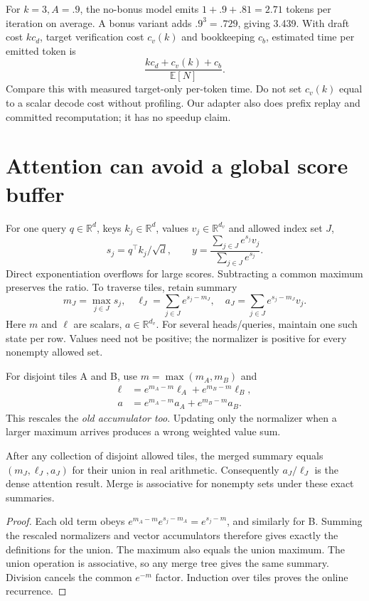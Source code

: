 For $k=3,A=.9$, the no-bonus model emits $1+.9+.81=2.71$ tokens per
iteration on average. A bonus variant adds $.9^3=.729$, giving 3.439.
With draft cost $kc_d$, target verification cost $c_v(k)$ and bookkeeping
$c_b$, estimated time per emitted token is
\[
 \frac{kc_d+c_v(k)+c_b}{\mathbb E[N]}.
\]
Compare this with measured target-only per-token time. Do not set
$c_v(k)$ equal to a scalar decode cost without profiling. Our adapter also
does prefix replay and committed recomputation; it has no speedup claim.

\section{Attention can avoid a global score buffer}
\label{evod38:attention}
For one query $q\in\mathbb R^{d}$, keys $k_j\in\mathbb R^d$, values
$v_j\in\mathbb R^{d_v}$ and allowed index set $J$,
\[
 s_j=q^\top k_j/\sqrt d,\qquad
 y=\frac{\sum_{j\in J} e^{s_j}v_j}{\sum_{j\in J}e^{s_j}}.
\]
Direct exponentiation overflows for large scores. Subtracting a common
maximum preserves the ratio. To traverse tiles, retain summary
\[
 m_J=\max_{j\in J}s_j,\quad
 \ell_J=\sum_{j\in J}e^{s_j-m_J},\quad
 a_J=\sum_{j\in J}e^{s_j-m_J}v_j.
\]
Here $m$ and $\ell$ are scalars, $a\in\mathbb R^{d_v}$. For several
heads/queries, maintain one such state per row. Values need not be positive;
the normalizer is positive for every nonempty allowed set.

For disjoint tiles A and B, use $m=\max(m_A,m_B)$ and
\begin{align*}
 \ell&=e^{m_A-m}\ell_A+e^{m_B-m}\ell_B,\\
 a&=e^{m_A-m}a_A+e^{m_B-m}a_B.
\end{align*}
This rescales the \emph{old accumulator too}. Updating only the normalizer
when a larger maximum arrives produces a wrong weighted value sum.

\begin{proposition}
After any collection of disjoint allowed tiles, the merged summary equals
$(m_J,\ell_J,a_J)$ for their union in real arithmetic. Consequently
$a_J/\ell_J$ is the dense attention result. Merge is associative for
nonempty sets under these exact summaries.
\end{proposition}
\begin{proof}
Each old term obeys
$e^{m_A-m}e^{s_j-m_A}=e^{s_j-m}$, and similarly for B. Summing the
rescaled normalizers and vector accumulators therefore gives exactly the
definitions for the union. The maximum also equals the union maximum.
The union operation is associative, so any merge tree gives the same
summary. Division cancels the common $e^{-m}$ factor. Induction over tiles
proves the online recurrence.
\end{proof}

